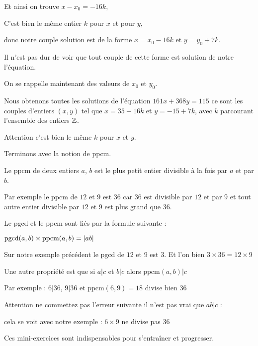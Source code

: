 \change

Et ainsi on trouve $x-x_0 = -16k$, 

\change

C'est bien le même entier $k$ pour $x$ et pour $y$,

donc notre couple solution est de la forme
$x=x_0-16k$ et $y=y_0+7k$.

Il n'est pas dur de voir que tout couple de cette forme est solution de notre l'équation.

\change

  On se rappelle maintenant des valeurs de $x_0$ et $y_0$.

\change

Nous obtenons toutes les solutions de l'équation $161 x + 368 y=115$
ce sont les couples d'entiers $(x,y)$
tel que 
$x=35-16k$ et $y=-15+7k$, avec $k$ parcourant l'ensemble des entiers $\mathbb{Z}$.

Attention c'est bien le même $k$ pour $x$ et $y$.


\diapo

Terminons avec la notion de ppcm.

Le ppcm de deux entiers $a$, $b$ est le plus petit entier divisible à la fois par $a$ et
par $b$.

\change

Par exemple le ppcm de $12$ et $9$ est $36$ car $36$ est divisible par $12$ et par $9$
et tout autre entier divisible par $12$ et $9$ est plus grand que $36$.

\change

Le pgcd et le ppcm sont liés par la formule suivante :

$\mathop{\mathrm{pgcd}}\nolimits(a,b) \times \text{ppcm}(a,b) = |ab|$

Sur notre exemple précédent le pgcd de $12$ et $9$ est $3$.
Et l'on bien $3\times 36=12\times9$

\change

Une autre propriété est que 
si $a|c$ et $b|c$ alors $\text{ppcm}(a,b)|c$

\change 

Par exemple : $6|36$, $9|36$ et  $\text{ppcm}(6,9)=18$ divise bien $36$

\change 

Attention ne commettez pas l'erreur suivante 
il n'est pas vrai que $ab|c$ : 

cela se voit avec notre exemple : $6\times 9$ ne divise pas $36$





\diapo

Ces mini-exercices sont indispensables pour s'entraîner et progresser.


